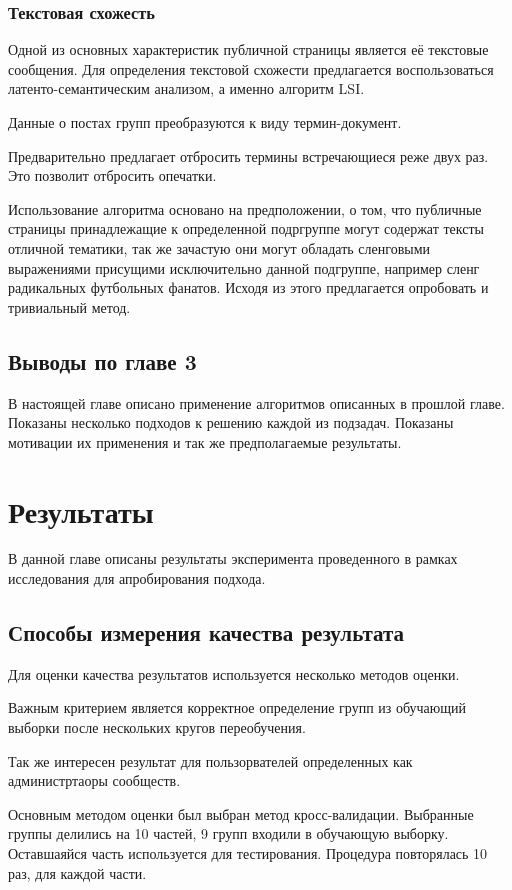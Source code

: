 \documentclass[annotation,times,page4]{itmo-student-thesis}
\begin{document}
\subsection{Текстовая схожесть}
Одной из основных характеристик публичной страницы является её текстовые сообщения. 
Для определения текстовой схожести предлагается воспользоваться латенто-семантическим анализом, а именно алгоритм LSI.  

Данные о постах групп преобразуются к виду термин-документ.

Предварительно предлагает отбросить термины встречающиеся реже двух раз. Это позволит отбросить опечатки. 

Использование алгоритма основано на предположении, о том, что публичные страницы принадлежащие к определенной подргруппе могут содержат тексты отличной тематики, так же зачастую они могут обладать сленговыми выражениями присущими исключительно данной подгруппе, например сленг радикальных футбольных фанатов. Исходя из этого предлагается опробовать и тривиальный метод.
 
\section{Выводы по главе 3}
В настоящей главе описано применение алгоритмов описанных в прошлой главе. Показаны несколько подходов к решению каждой из подзадач. Показаны мотивации их применения и так же предполагаемые результаты. 
\chapter{Результаты}
В данной главе описаны результаты эксперимента проведенного в рамках исследования для апробирования подхода.
\section{Способы измерения качества результата}
Для оценки качества результатов используется несколько методов оценки.

Важным критерием является корректное определение групп из обучающий выборки после нескольких кругов переобучения. 

Так же интересен результат для пользорвателей определенных как администртаоры сообществ.

Основным методом оценки был выбран метод кросс-валидации. Выбранные группы делились на 10 частей, 9 групп входили в обучающую выборку. Оставшаяйся часть используется для тестирования. Процедура повторялась 10 раз, для каждой части.
\end{document}
